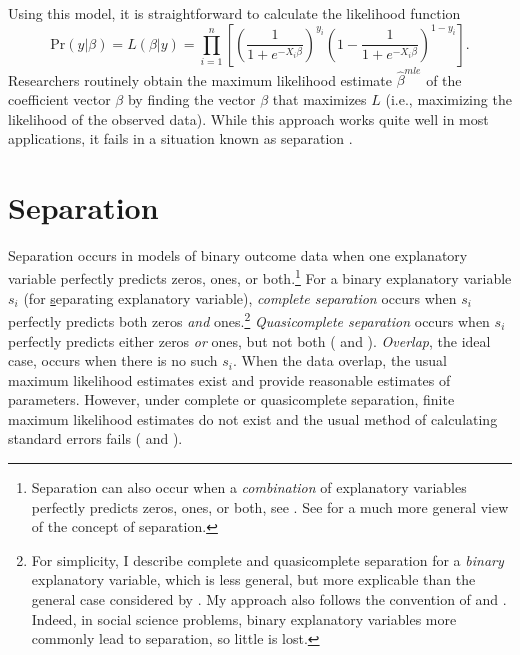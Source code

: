 \documentclass[12pt]{article}
\begin{document}
Using this model, it is straightforward to calculate the likelihood function 
\begin{equation}\nonumber
\text{Pr}(y | \beta) = L(\beta | y) = \displaystyle \prod_{i = 1}^n \left[\left( \dfrac{1}{1 + e^{-X_i\beta}}\right)^{y_i}\left(1 - \dfrac{1}{1 + e^{-X_i\beta}}\right)^{1 - y_i}\right]\text{.}
\end{equation}
Researchers routinely obtain the maximum likelihood estimate $\hat{\beta}^{mle}$ of the coefficient vector $\beta$ by finding the vector $\beta$ that maximizes $L$ (i.e., maximizing the likelihood of the observed data). 
While this approach works quite well in most applications, it fails in a situation known as separation \citep{Zorn2005}.

\section*{Separation}

Separation occurs in models of binary outcome data when one explanatory variable perfectly predicts zeros, ones, or both.\footnote{
Separation can also occur when a \emph{combination} of explanatory variables perfectly predicts zeros, ones, or both, see \cite{LesaffreAlbert1989}. 
See \cite{Geyer2009} for a much more general view of the concept of separation.} 
For a binary explanatory variable $s_i$ (for \underline{s}eparating explanatory variable), \textit{complete separation} occurs when $s_i$ perfectly predicts both zeros \emph{and} ones.\footnote{
For simplicity, I describe complete and quasicomplete separation for a \textit{binary} explanatory variable, which is less general, but more explicable than the general case considered by \cite{AlbertAnderson1984}. 
My approach also follows the convention of \cite{HeinzeSchemper2002} and \cite{Zorn2005}. 
Indeed, in social science problems, binary explanatory variables more commonly lead to separation, so little is lost.} 
\textit{Quasicomplete separation} occurs when $s_i$ perfectly predicts either zeros \emph{or} ones, but not both (\citealt{AlbertAnderson1984} and \citealt{Zorn2005}). 
\textit{Overlap}, the ideal case, occurs when there is no such $s_i$. 
When the data overlap, the usual maximum likelihood estimates exist and provide reasonable estimates of parameters. 
However, under complete or quasicomplete separation, finite maximum likelihood estimates do not exist and the usual method of calculating standard errors fails (\citealt{AlbertAnderson1984} and \citealt{Zorn2005}).
\end{document}
